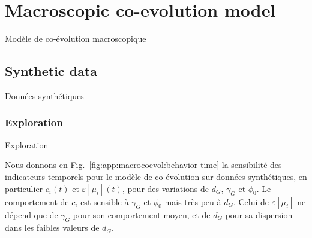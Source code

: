 \newpage

\section{Macroscopic co-evolution model}{Modèle de co-évolution macroscopique}

\label{app:sec:macrocoevol}



\subsection{Synthetic data}{Données synthétiques}


\subsubsection{Exploration}{Exploration}


Nous donnons en Fig.~\ref{fig:app:macrocoevol:behavior-time} la sensibilité des indicateurs temporels pour le modèle de co-évolution sur données synthétiques, en particulier $\bar{c_i}(t)$ et $\varepsilon\left[\mu_i\right](t)$, pour des variations de $d_G$, $\gamma_G$ et $\phi_0$. Le comportement de $\bar{c_i}$ est sensible à $\gamma_G$ et $\phi_0$ mais très peu à $d_G$. Celui de $\varepsilon\left[\mu_i\right]$ ne dépend que de $\gamma_G$ pour son comportement moyen, et de $d_G$ pour sa dispersion dans les faibles valeurs de $d_G$.


